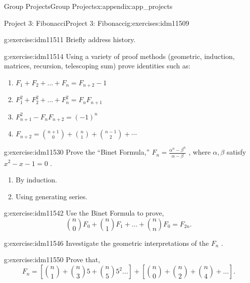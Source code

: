 \documentclass[oneside,10pt,]{book}
\numberwithin{equation}{chapter}
\begin{document}
\begin{appendixptx}{Group Projects}{}{Group Projects}{}{}{x:appendix:app_projects}
%
\begin{exercises-section-numberless}{Project 3: Fibonacci}{}{Project 3: Fibonacci}{}{}{g:exercises:idm11509}
\begin{divisionexercise}{1}{}{}{g:exercise:idm11511}%
Briefly address history.%
\end{divisionexercise}%
\begin{divisionexercise}{2}{}{}{g:exercise:idm11514}%
Using a variety of proof methods (geometric, induction, matrices, recursion, telescoping sum) prove identities such as:%
\begin{enumerate}[label=(\alph*)]
\item{}\(F_{1} + F_{2} + \ldots + F_{n} = F_{n + 2} - 1\)%
\item{}\(F_{1}^{2} + F_{2}^{2} + \ldots + F_{n}^{2} = F_{n}F_{n + 1}\)%
\item{}\(F_{n + 1}^{2} - F_{n}F_{n + 2} = \left( - 1 \right)^{n}\)%
\item{}\(F_{n + 2} = \binom{n + 1}{0} + \binom{n}{1} + \binom{n - 1}{2} + \cdots\)%
\end{enumerate}
%
\end{divisionexercise}%
\begin{divisionexercise}{3}{}{}{g:exercise:idm11530}%
Prove the ``Binet Formula,'' \(F_{n} = \frac{\alpha^{n} - \beta^{n}}{\alpha - \beta}\) , where \(\alpha,\beta\) satisfy \(x^{2} - x - 1 = 0\) .%
\begin{enumerate}[label=(\alph*)]
\item{}By induction.%
\item{}Using generating series.%
\end{enumerate}
%
\end{divisionexercise}%
\begin{divisionexercise}{4}{}{}{g:exercise:idm11542}%
Use the Binet Formula to prove,%
\begin{equation*}
\binom{n}{0}F_{0} + \binom{n}{1} F_{1} + \ldots + \binom{n}{n}F_{0} = F_{2n}.
\end{equation*}
%
\end{divisionexercise}%
\begin{divisionexercise}{5}{}{}{g:exercise:idm11546}%
Investigate the geometric interpretations of the \(F_{n}\) .%
\end{divisionexercise}%
\begin{divisionexercise}{6}{}{}{g:exercise:idm11550}%
Prove that,%
\begin{equation*}
F_{n} = \left\lbrack \binom{n}{1}  + \binom{n}{3} 5 + \binom{n}{5} 5^{2}\ldots \right\rbrack + \left\lbrack \binom{n}{0}  + \binom{n}{2}  + \binom{n}{4}  + \ldots \right\rbrack.

\end{equation*}
\end{divisionexercise}
\end{exercises-section-numberless}
\end{appendixptx}
\end{document}
